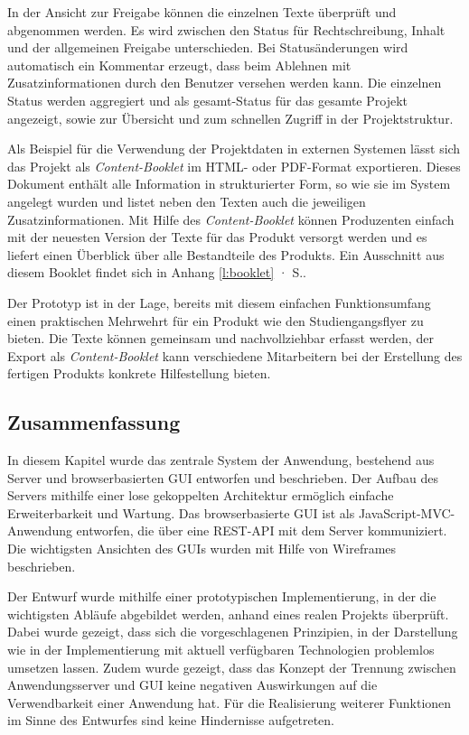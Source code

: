 In der Ansicht zur Freigabe können die einzelnen Texte überprüft und abgenommen werden. Es wird zwischen den Status für Rechtschreibung, Inhalt und der allgemeinen Freigabe unterschieden. Bei Statusänderungen wird automatisch ein Kommentar erzeugt, dass beim Ablehnen mit Zusatzinformationen durch den Benutzer versehen werden kann. Die einzelnen Status werden aggregiert und als gesamt-Status für das gesamte Projekt angezeigt, sowie zur Übersicht und zum schnellen Zugriff in der Projektstruktur.

Als Beispiel für die Verwendung der Projektdaten in externen Systemen lässt sich das Projekt als \emph{Content-Booklet} im HTML- oder PDF-Format exportieren. Dieses Dokument enthält alle Information in strukturierter Form, so wie sie im System angelegt wurden und listet neben den Texten auch die jeweiligen Zusatzinformationen. Mit Hilfe des \emph{Content-Booklet} können Produzenten einfach mit der neuesten Version der Texte für das Produkt versorgt werden und es liefert einen Überblick über alle Bestandteile des Produkts. Ein Ausschnitt aus diesem Booklet findet sich in Anhang \ref{l:booklet} · S.\pageref{l:booklet}.

\secbar

Der Prototyp ist in der Lage, bereits mit diesem einfachen Funktionsumfang einen praktischen Mehrwehrt für ein Produkt wie den Studiengangsflyer zu bieten. Die Texte können gemeinsam und nachvollziehbar erfasst werden, der Export als \emph{Content-Booklet} kann verschiedene Mitarbeitern bei der Erstellung des fertigen Produkts konkrete Hilfestellung bieten.

\pagebreak

\subsection{Zusammenfassung}

In diesem Kapitel wurde das zentrale System der Anwendung, bestehend aus Server und browserbasierten GUI entworfen und beschrieben. Der Aufbau des Servers mithilfe einer lose gekoppelten Architektur ermöglich einfache Erweiterbarkeit und Wartung. Das browserbasierte GUI ist als JavaScript-MVC-Anwendung entworfen, die über eine REST-API mit dem Server kommuniziert. Die wichtigsten Ansichten des GUIs wurden mit Hilfe von Wireframes beschrieben. 

Der Entwurf wurde mithilfe einer prototypischen Implementierung, in der die wichtigsten Abläufe abgebildet werden, anhand eines realen Projekts überprüft. Dabei wurde gezeigt, dass sich die vorgeschlagenen Prinzipien, in der Darstellung wie in der Implementierung mit aktuell verfügbaren Technologien problemlos umsetzen lassen. Zudem wurde gezeigt, dass das Konzept der Trennung zwischen Anwendungsserver und GUI keine negativen Auswirkungen auf die Verwendbarkeit einer Anwendung hat. Für die Realisierung weiterer Funktionen im Sinne des Entwurfes sind keine Hindernisse aufgetreten.

